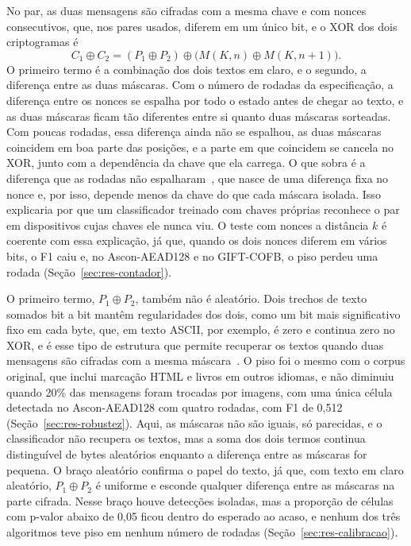 No par, as duas mensagens são cifradas com a mesma chave e com nonces consecutivos, que, nos pares usados, diferem em um único bit, e o XOR dos dois criptogramas é
\begin{equation}
C_1 \oplus C_2 = (P_1 \oplus P_2) \oplus \big(M(K, n) \oplus M(K, n+1)\big).
\end{equation}
O primeiro termo é a combinação dos dois textos em claro, e o segundo, a diferença entre as duas máscaras. Com o número de rodadas da especificação, a diferença entre os nonces se espalha por todo o estado antes de chegar ao texto, e as duas máscaras ficam tão diferentes entre si quanto duas máscaras sorteadas. Com poucas rodadas, essa diferença ainda não se espalhou, as duas máscaras coincidem em boa parte das posições, e a parte em que coincidem se cancela no XOR, junto com a dependência da chave que ela carrega. O que sobra é a diferença que as rodadas não espalharam~\cite{BihamShamir1991}, que nasce de uma diferença fixa no nonce e, por isso, depende menos da chave do que cada máscara isolada. Isso explicaria por que um classificador treinado com chaves próprias reconhece o par em dispositivos cujas chaves ele nunca viu. O teste com nonces a distância $k$ é coerente com essa explicação, já que, quando os dois nonces diferem em vários bits, o F1 caiu e, no Ascon-AEAD128 e no GIFT-COFB, o piso perdeu uma rodada (Seção~\ref{sec:res-contador}).

O primeiro termo, $P_1 \oplus P_2$, também não é aleatório. Dois trechos de texto somados bit a bit mantêm regularidades dos dois, como um bit mais significativo fixo em cada byte, que, em texto ASCII, por exemplo, é zero e continua zero no XOR, e é esse tipo de estrutura que permite recuperar os textos quando duas mensagens são cifradas com a mesma máscara~\cite{Mason2006TwoTimePad}. O piso foi o mesmo com o corpus original, que inclui marcação HTML e livros em outros idiomas, e não diminuiu quando 20\% das mensagens foram trocadas por imagens, com uma única célula detectada no Ascon-AEAD128 com quatro rodadas, com F1 de 0,512 (Seção~\ref{sec:res-robustez}). Aqui, as máscaras não são iguais, só parecidas, e o classificador não recupera os textos, mas a soma dos dois termos continua distinguível de bytes aleatórios enquanto a diferença entre as máscaras for pequena. O braço aleatório confirma o papel do texto, já que, com texto em claro aleatório, $P_1 \oplus P_2$ é uniforme e esconde qualquer diferença entre as máscaras na parte cifrada. Nesse braço houve detecções isoladas, mas a proporção de células com p-valor abaixo de 0,05 ficou dentro do esperado ao acaso, e nenhum dos três algoritmos teve piso em nenhum número de rodadas (Seção~\ref{sec:res-calibracao}).

